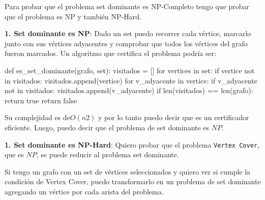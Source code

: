 \documentclass[../tp3_grupo404.tex]{subfiles}
\begin{document}
Para probar que el problema set dominante es NP-Completo tengo que probar que el problema
es NP y también NP-Hard.

\textbf{1. Set dominante es NP}: Dado un set puedo recorrer cada vértice, marcarlo junto con
sus vértices adyacentes y comprobar que todos los vértices del grafo fueron marcados.
Un algoritmo que certifica el problema podría ser:

\begin{alternate}[breaklines=true,numbers=left,xleftmargin=5mm]
    def es_set_dominante(grafo, set):
    visitados = []
    for vertices in set:
        if vertice not in visitados:
            visitados.append(vertice)
        for v_adyacente in vertice:
            if v_adyacente not in visitados:
                visitados.append(v_adyacente)
    if len(visitados) == len(grafo):
        return true
    return false
\end{alternate}

Su complejidad es de$ O(n2)$ y por lo tanto puedo decir que es un certificador eficiente.
Luego, puedo decir que el problema de set dominante es $NP$.

\textbf{1. Set dominante es NP-Hard}: Quiero probar que el problema \texttt{Vertex Cover},
que es $NP$, se puede reducir al problema set dominante.

Si tengo un grafo con un set de vértices seleccionados y quiero ver si cumple la condición
de Vertex Cover, puedo transformarlo en un problema de set dominante agregando un vértice
por cada arista del problema.

\end{document}
